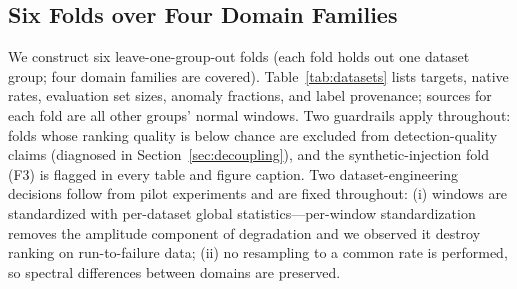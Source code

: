 \subsection{Six Folds over Four Domain Families}
\label{sec:folds}
We construct six leave-one-group-out folds (each fold holds out one dataset group; four domain families are covered). Table~\ref{tab:datasets} lists targets, native rates, evaluation set sizes, anomaly fractions, and label provenance; sources for each fold are all other groups' normal windows. Two guardrails apply throughout: folds whose ranking quality is below chance are excluded from detection-quality claims (diagnosed in Section~\ref{sec:decoupling}), and the synthetic-injection fold (F3) is flagged in every table and figure caption. Two dataset-engineering decisions follow from pilot experiments and are fixed throughout: (i) windows are standardized with per-dataset global statistics---per-window standardization removes the amplitude component of degradation and we observed it destroy ranking on run-to-failure data; (ii) no resampling to a common rate is performed, so spectral differences between domains are preserved.

\begin{table}[t]
\caption{Folds, datasets, native rates, and evaluation sets (windows of length 256, stride 128). F4's Paderborn component is the time-varying run-to-failure release at 128\,kHz; F5's fault sections are sampled at 48.8\,kHz, half the 97.7\,kHz baseline. Anomaly fractions vary by protocol and matter for interpreting alarm-budget effects.}
\label{tab:datasets}
\centering
\small
{}
\end{table}

